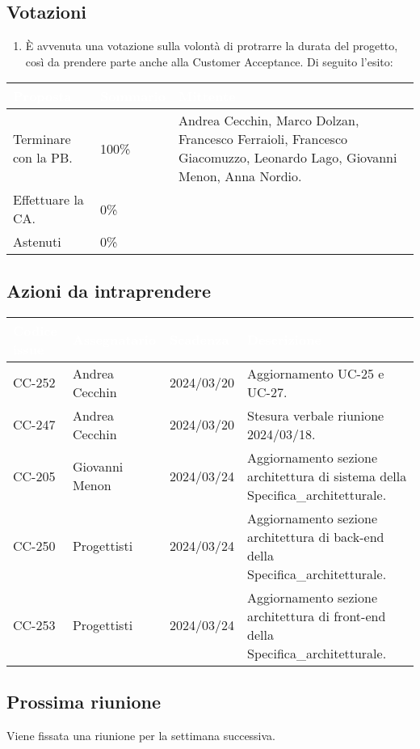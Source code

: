 \subsection{Votazioni} \label{subsec:resvotazione}
\begin{enumerate}
    \item È avvenuta una votazione sulla volontà di protrarre la durata del progetto, così da prendere parte anche alla Customer Acceptance. Di seguito l'esito:
\end{enumerate}
\begingroup
    \setlength{\tabcolsep}{10pt}
    \renewcommand{\arraystretch}{1.5}
    \begin{tabularx}{\textwidth}{| l | l | X |}
         \hline
         \rowcolor{headerrow}\textbf{\textcolor{white}{Proposta}} & \textbf{\textcolor{white}{Sommario}} & \textbf{\textcolor{white}{Mittente}} \\
         \hline
         Terminare con la PB. & 100\%  & Andrea Cecchin, Marco Dolzan, Francesco Ferraioli, Francesco Giacomuzzo, Leonardo Lago, Giovanni Menon, Anna Nordio.\\
         \hline
         Effettuare la CA. & 0\% &  \\
         \hline
         Astenuti & 0\% & \\
         \hline
    \end{tabularx}
\endgroup

\subsection{Azioni da intraprendere}
{
    \setlength{\tabcolsep}{10pt}
            \renewcommand{\arraystretch}{1.5}
            \begin{xltabular}{\textwidth}{| l | l | l | X |}
                 \hline
                 \textbf{\textcolor{white}{Codice issue}} & \textbf{\textcolor{white}{Assegnatario}} & \textbf{\textcolor{white}{Scadenza}} & \textbf{\textcolor{white}{Descrizione}} \\
                 \hline
                 CC-252 & Andrea Cecchin & 2024/03/20 & Aggiornamento UC-25 e UC-27.\\
                 \hline
                 CC-247 & Andrea Cecchin & 2024/03/20 & Stesura verbale riunione 2024/03/18.\\
                 \hline
                 CC-205 & Giovanni Menon & 2024/03/24 & Aggiornamento sezione architettura di sistema della Specifica\_architetturale.\\
                 \hline
                 CC-250 & Progettisti & 2024/03/24 & Aggiornamento sezione architettura di back-end della Specifica\_architetturale.\\
                 \hline
                 CC-253 & Progettisti & 2024/03/24 & Aggiornamento sezione architettura di front-end della Specifica\_architetturale.\\
                 \hline
            \end{xltabular}
}

\subsection{Prossima riunione} \label{subsec:riunione}
Viene fissata una riunione per la settimana successiva.